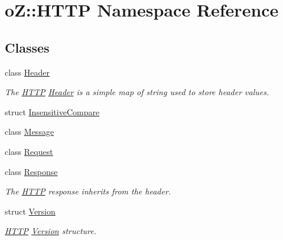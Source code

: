 \hypertarget{namespaceo_z_1_1_h_t_t_p}{}\section{oZ\+::H\+T\+TP Namespace Reference}
\label{namespaceo_z_1_1_h_t_t_p}
\subsection*{Classes}
\begin{DoxyCompactItemize}
\item 
class \mbox{\hyperlink{classo_z_1_1_h_t_t_p_1_1_header}{Header}}
\begin{DoxyCompactList}\small\item\em The \mbox{\hyperlink{namespaceo_z_1_1_h_t_t_p}{H\+T\+TP}} \mbox{\hyperlink{classo_z_1_1_h_t_t_p_1_1_header}{Header}} is a simple map of string used to store header values. \end{DoxyCompactList}\item 
struct \mbox{\hyperlink{structo_z_1_1_h_t_t_p_1_1_insensitive_compare}{Insensitive\+Compare}}
\item 
class \mbox{\hyperlink{classo_z_1_1_h_t_t_p_1_1_message}{Message}}
\item 
class \mbox{\hyperlink{classo_z_1_1_h_t_t_p_1_1_request}{Request}}
\item 
class \mbox{\hyperlink{classo_z_1_1_h_t_t_p_1_1_response}{Response}}
\begin{DoxyCompactList}\small\item\em The \mbox{\hyperlink{namespaceo_z_1_1_h_t_t_p}{H\+T\+TP}} response inherits from the header. \end{DoxyCompactList}\item 
struct \mbox{\hyperlink{structo_z_1_1_h_t_t_p_1_1_version}{Version}}
\begin{DoxyCompactList}\small\item\em \mbox{\hyperlink{namespaceo_z_1_1_h_t_t_p}{H\+T\+TP}} \mbox{\hyperlink{structo_z_1_1_h_t_t_p_1_1_version}{Version}} structure. \end{DoxyCompactList}\end{DoxyCompactItemize}
